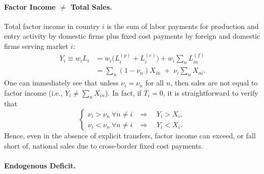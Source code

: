\documentclass[12pt]{article}
\begin{document}
\paragraph{Factor Income $\neq$ Total Sales.}

Total factor income in country $i$ is the sum of labor payments for production and entry activity by domestic firms plus fixed cost payments by foreign and domestic firms serving market $i$:
\begin{align}
    Y_i \equiv w_i L_i 
    &= w_i\bigl(L_i^{(p)} + L_i^{(e)}\bigr) + w_i \sum_{n} L_{in}^{(f)}       \nonumber\\[2pt]
    &= \sum_{n}(1-\nu_n)X_{in}  \;+\; \nu_i \sum_{n} X_{ni}.
    \label{eq:income_breakdown}
\end{align}
One can immediately see that unless $\nu_i=\nu_n$ for all $n$, then sales are not equal to factor income (i.e., $Y_i \neq \sum_{n} X_{in}$). In fact, if $\bar T_i=0$, it is straightforward to verify that
\begin{equation}
\begin{cases}
    \nu_i > \nu_n \ \forall n\neq i &\Longrightarrow\quad  Y_i > X_i, \\[4pt]
    \nu_i < \nu_n \ \forall n\neq i &\Longrightarrow\quad  Y_i < X_i.
\end{cases}
\label{eq:divergence_cases}
\end{equation}
Hence, even in the absence of explicit transfers, factor income can exceed, or fall short of, national sales due to cross-border fixed cost payments.

\paragraph{Endogenous Deficit.}
\end{document}
